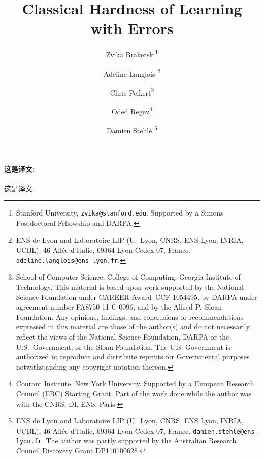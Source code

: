 \documentclass[letterpaper,11pt]{article}
\title{\bf Classical Hardness of Learning with Errors}
\date{}
\author{
Zvika Brakerski\thanks{Stanford University, \texttt{zvika@stanford.edu}. Supported by a Simons Postdoctoral Fellowship and DARPA.}
\and
Adeline Langlois
\thanks{ENS de Lyon and Laboratoire LIP (U.\ Lyon, CNRS, ENS Lyon, INRIA, UCBL),
    46 All\'ee d'Italie, 69364 Lyon Cedex 07, France. \texttt{adeline.langlois@ens-lyon.fr}.}
\and
%
Chris Peikert\thanks{School of Computer Science, College of
    Computing, Georgia Institute of Technology.
    This material is based upon work supported by the National Science
    Foundation under CAREER Award~CCF-1054495, by DARPA under
    agreement number FA8750-11-C-0096, and by the Alfred P.~Sloan
    Foundation.  Any opinions, findings, and conclusions or
    recommendations expressed in this material are those of the
    author(s) and do not necessarily reflect the views of the National
    Science Foundation, DARPA or the U.S.~Government, or the Sloan
    Foundation.  The U.S. Government is authorized to reproduce and
    distribute reprints for Governmental purposes notwithstanding any
    copyright notation thereon.}
%
  \and Oded Regev\thanks{Courant Institute, New York
    University. Supported by a European Research Council (ERC)
    Starting Grant. Part of the work done while the author was with
    the CNRS, DI, ENS, Paris.}
\and
%
Damien Stehl\'e \thanks{ENS de Lyon and Laboratoire LIP (U.\ Lyon,
  CNRS, ENS Lyon, INRIA, UCBL), 46 All\'ee d'Italie, 69364 Lyon Cedex
  07, France. \texttt{damien.stehle@ens-lyon.fr}.  The author was
  partly supported by the Australian Research Council Discovery Grant
  DP110100628.  }
}
\begin{document}
\maketitle

\begin{abstract}
  
\end{abstract}

\noteswarning





%

%







\paragraph{这是译文:} 这是译文.





%
\end{document}
